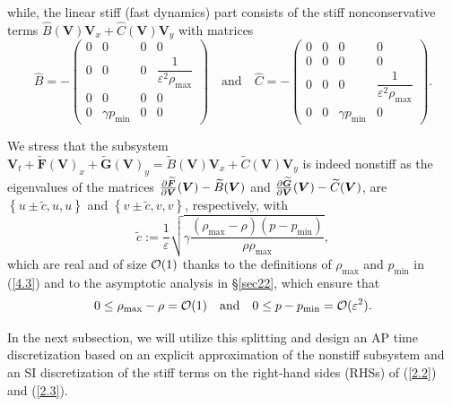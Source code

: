 \documentclass[A4paper,12pt,twoside]{article}
\numberwithin{equation}{section}
\numberwithin{figure}{section}
\numberwithin{table}{section}
\newcommand{\mF}{\bm{F}}
\newcommand{\mG}{\bm{G}}
\newcommand{\ve}{\varepsilon}
\newcommand\eref[1]{(\ref{#1})}
\newcommand{\uvec}[2][3]{\boldsymbol{#2\mkern-#1mu}\mkern#1mu}
\newcommand{\lore}[1]{{\leavevmode\color{red} #1}}
\begin{document}
while, the linear stiff (fast dynamics) part consists of the stiff nonconservative terms $\widehat B(\bm V)\bm V_x+\widehat C(\bm V)\bm V_y$
with matrices %
\begin{equation*}
\widehat B=-\begin{pmatrix}0&0&0&0\\0&0&0&\dfrac{1}{\ve^2\rho_{\max}}\\0&0&0&0\\0&\gamma p_{\min}&0&0\end{pmatrix}
\quad\mbox{and}\quad
\widehat C=-\begin{pmatrix}0&0&0&0\\0&0&0&0\\0&0&0&\dfrac{1}{\ve^2\rho_{\max}}\\0&0&\gamma p_{\min}&0\end{pmatrix}.
\end{equation*}

We stress that the subsystem
$\bm V_t+\widetilde{\mF}(\bm V)_x+\widetilde{\mG}(\bm V)_y=\widetilde B(\bm V)\bm V_x+\widetilde C(\bm V)\bm V_y$ is indeed nonstiff as the
eigenvalues of the matrices
$\frac{\partial\widetilde{\mF}}{\partial\bm V}(\uvec{V})-\widetilde B(\bm V)$ and
$\frac{\partial\widetilde{\mG}}{\partial\bm V}(\uvec{V})-\widetilde C(\bm V)$, are $\left\{u\pm\tilde c,u,u\right\}$ and
$\left\{v\pm\tilde c,v,v\right\}$, respectively, with 
\begin{equation}
\tilde c:=\frac{1}{\ve}\sqrt{\gamma\frac{(\rho_{\max}-\rho)(p-p_{\min})}{\rho\rho_{\max}}},
\label{4.48f}
\end{equation}
which are real and of size ${\cal O}(1)$ thanks to the definitions of $\rho_{\max}$ and $p_{\min}$ in \eref{4.3} and \lore{to} the asymptotic
analysis in \S\ref{sec22}, which ensure that
\begin{equation}
0\le\rho_{\max}-\rho={\cal O}(1)\quad\mbox{and}\quad0\le p-p_{\min}={\cal O}(\ve^2).
\label{4.7}
\end{equation}

In the next subsection, we will utilize this splitting and design an AP time discretization %
\lore{based on} an explicit approximation of the nonstiff 
subsystem and \lore{an} SI discretization of the stiff terms on the right-hand sides (RHSs) of \eref{2.2} and \eref{2.3}.
\end{document}
